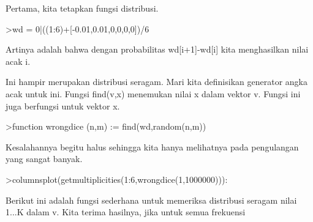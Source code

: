 \documentclass[a4paper,10pt]{article}
\begin{document}
\begin{eulernotebook}
\begin{eulercomment}
\begin{eulercomment}
\begin{eulercomment}
\begin{eulercomment}
\begin{eulercomment}
\begin{eulercomment}
\begin{eulercomment}
\begin{eulercomment}
\begin{eulercomment}
\begin{eulercomment}
\begin{eulercomment}
\begin{eulercomment}
\begin{eulercomment}
\begin{eulercomment}
\begin{eulercomment}
\begin{eulercomment}
\begin{eulercomment}
\begin{eulercomment}
\begin{eulercomment}
\begin{eulercomment}
\begin{eulercomment}
\begin{eulercomment}
\begin{eulercomment}
\begin{eulercomment}
\begin{eulercomment}
\begin{eulercomment}
\begin{eulercomment}
\begin{eulercomment}
\begin{eulercomment}
\begin{eulercomment}
\begin{eulercomment}
\begin{eulercomment}
\begin{eulercomment}
Pertama, kita tetapkan fungsi distribusi.
\end{eulercomment}
\begin{eulerprompt}
>wd = 0|((1:6)+[-0.01,0.01,0,0,0,0])/6
\end{eulerprompt}
\begin{euleroutput}
  [0,  0.165,  0.335,  0.5,  0.666667,  0.833333,  1]
\end{euleroutput}
\begin{eulercomment}
Artinya adalah bahwa dengan probabilitas wd[i+1]-wd[i] kita
menghasilkan nilai acak i.

Ini hampir merupakan distribusi seragam. Mari kita definisikan
generator angka acak untuk ini. Fungsi find(v,x) menemukan nilai x
dalam vektor v. Fungsi ini juga berfungsi untuk vektor x.
\end{eulercomment}
\begin{eulerprompt}
>function wrongdice (n,m) := find(wd,random(n,m))
\end{eulerprompt}
\begin{eulercomment}
Kesalahannya begitu halus sehingga kita hanya melihatnya pada
pengulangan yang sangat banyak.
\end{eulercomment}
\begin{eulerprompt}
>columnsplot(getmultiplicities(1:6,wrongdice(1,1000000))):
\end{eulerprompt}
\begin{eulercomment}
Berikut ini adalah fungsi sederhana untuk memeriksa distribusi seragam
nilai 1...K dalam v. Kita terima hasilnya, jika untuk semua frekuensi


\end{eulercomment}
\end{eulercomment}
\end{eulercomment}
\end{eulercomment}
\end{eulercomment}
\end{eulercomment}
\end{eulercomment}
\end{eulercomment}
\end{eulercomment}
\end{eulercomment}
\end{eulercomment}
\end{eulercomment}
\end{eulercomment}
\end{eulercomment}
\end{eulercomment}
\end{eulercomment}
\end{eulercomment}
\end{eulercomment}
\end{eulercomment}
\end{eulercomment}
\end{eulercomment}
\end{eulercomment}
\end{eulercomment}
\end{eulercomment}
\end{eulercomment}
\end{eulercomment}
\end{eulercomment}
\end{eulercomment}
\end{eulercomment}
\end{eulercomment}
\end{eulercomment}
\end{eulercomment}
\end{eulercomment}
\end{eulernotebook}
\end{document}
